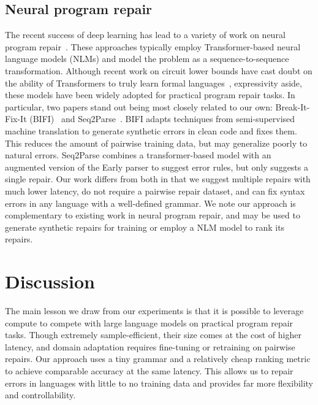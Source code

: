 \documentclass[sigplan,review,anonymous,acmsmall]{acmart}\settopmatter{printfolios=false,printccs=false,printacmref=false}
\begin{document}
  \subsection{Neural program repair}

  The recent success of deep learning has lead to a variety of work on neural program repair~\cite{allamanis2021self, chirkova2021empirical, drain2021generating}. These approaches typically employ Transformer-based neural language models (NLMs) and model the problem as a sequence-to-sequence transformation. Although recent work on circuit lower bounds have cast doubt on the ability of Transformers to truly learn formal languages~\cite{merrill2022saturated, chiang2023tighter}, expressivity aside, these models have been widely adopted for practical program repair tasks. In particular, two papers stand out being most closely related to our own: Break-It-Fix-It (BIFI)~\cite{yasunaga2021break} and Seq2Parse~\cite{sakkas2022seq2parse}. BIFI adapts techniques from semi-supervised machine translation to generate synthetic errors in clean code and fixes them. This reduces the amount of pairwise training data, but may generalize poorly to natural errors. Seq2Parse combines a transformer-based model with an augmented version of the Early parser to suggest error rules, but only suggests a single repair. Our work differs from both in that we suggest multiple repairs with much lower latency, do not require a pairwise repair dataset, and can fix syntax errors in any language with a well-defined grammar. We note our approach is complementary to existing work in neural program repair, and may be used to generate synthetic repairs for training or employ a NLM model to rank its repairs.

  \section{Discussion}\label{sec:discussion}

  The main lesson we draw from our experiments is that it is possible to leverage compute to compete with large language models on practical program repair tasks. Though extremely sample-efficient, their size comes at the cost of higher latency, and domain adaptation requires fine-tuning or retraining on pairwise repairs. Our approach uses a tiny grammar and a relatively cheap ranking metric to achieve comparable accuracy at the same latency. This allows us to repair errors in languages with little to no training data and provides far more flexibility and controllability.
\end{document}
